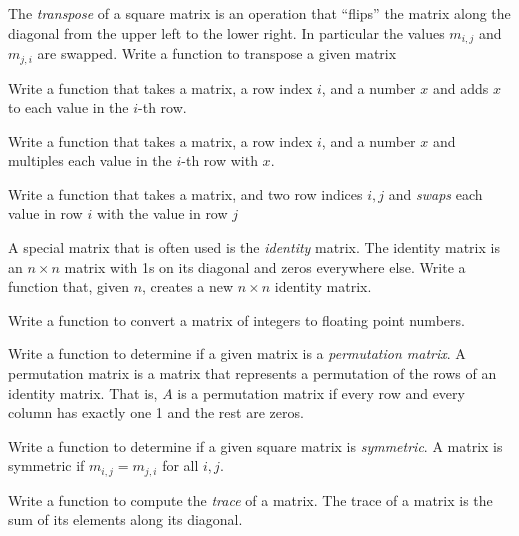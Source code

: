 \begin{exer}
The \emph{transpose} of a square matrix is an operation
that ``flips'' the matrix along the diagonal from the upper left
to the lower right.  In particular the values $m_{i,j}$ and $m_{j, i}$
are swapped.  Write a function to transpose a given matrix
\end{exer}

\begin{exer}
Write a function that takes a matrix, a row index $i$, and a number
$x$ and adds $x$ to each value in the $i$-th row.
\end{exer}

\begin{exer}
Write a function that takes a matrix, a row index $i$, and a number
$x$ and multiples each value in the $i$-th row with $x$.
\end{exer}

\begin{exer}
Write a function that takes a matrix, and two row indices $i, j$
and \emph{swaps} each value in row $i$ with the value in row $j$
\end{exer}

\begin{exer}
A special matrix that is often used is the \emph{identity} matrix.  
The identity matrix is an $n \times n$ matrix with 1s on its diagonal 
and zeros everywhere else.  Write a function that, given $n$, 
creates a new $n\times n$ identity matrix.
\end{exer}

\begin{exer}
Write a function to convert a matrix of integers to 
floating point numbers.
\end{exer}

\begin{exer}
Write a function to determine if a given matrix is a 
\emph{permutation matrix}.  A permutation matrix is a 
matrix that represents a permutation of the rows of an 
identity matrix.  That is, $A$ is a permutation matrix if 
every row and every column has exactly one 1 and the 
rest are zeros.
\end{exer}

\begin{exer}
Write a function to determine if a given square matrix 
is \emph{symmetric}.  A matrix is symmetric if $m_{i,j} = m_{j,i}$ 
for all $i, j$. 
\end{exer}

\begin{exer}
Write a function to compute the \emph{trace} of a matrix.  
The trace of a matrix is the sum of its elements along its 
diagonal.
\end{exer}

